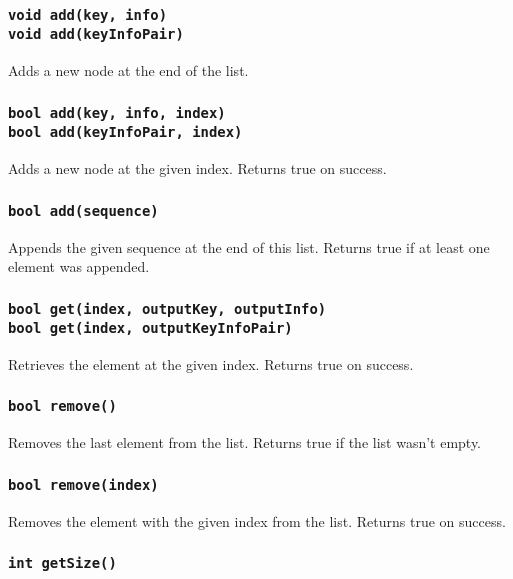 ﻿\documentclass{article}
\begin{document}
\subsubsection{{\tt void add(key, info)}\\
{\tt void add(keyInfoPair)}}

Adds a new node at the end of the list.

\subsubsection{{\tt bool add(key, info, index)}\\
{\tt bool add(keyInfoPair, index)}}

Adds a new node at the given index. Returns true on success.

\subsubsection{{\tt bool add(sequence)}}

Appends the given sequence at the end of this list. Returns true if at least one
element was appended.

\subsubsection{{\tt bool get(index, outputKey, outputInfo)}\\
{\tt bool get(index, outputKeyInfoPair)}}

Retrieves the element at the given index. Returns true on success.

\subsubsection{{\tt bool remove()}}

Removes the last element from the list. Returns true if the list wasn't empty.

\subsubsection{{\tt bool remove(index)}}

Removes the element with the given index from the list. Returns true on success.

\subsubsection{{\tt int getSize()}}
\end{document}
